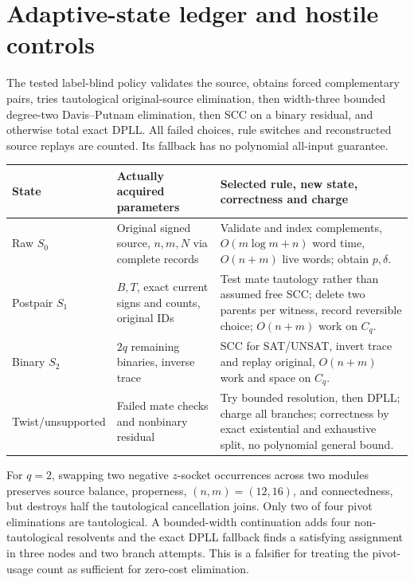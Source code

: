 \documentclass[11pt]{article}
\begin{document}
\section{Adaptive-state ledger and hostile controls}
The tested label-blind policy validates the source, obtains forced complementary pairs, tries tautological original-source elimination, then width-three bounded degree-two Davis--Putnam elimination, then SCC on a binary residual, and otherwise total exact DPLL. All failed choices, rule switches and reconstructed source replays are counted. Its fallback has no polynomial all-input guarantee.
\begin{center}\small
\begin{tabular}{p{.17\linewidth}p{.31\linewidth}p{.4\linewidth}}\toprule
State & Actually acquired parameters & Selected rule, new state, correctness and charge\\\midrule
Raw $S_0$ & Original signed source, $n,m,N$ via complete records & Validate and index complements, $O(m\log m+n)$ word time, $O(n+m)$ live words; obtain $p,\delta$.\\
Postpair $S_1$ & $B,T$, exact current signs and counts, original IDs & Test mate tautology rather than assumed free SCC; delete two parents per witness, record reversible choice; $O(n+m)$ work on $C_q$.\\
Binary $S_2$ & $2q$ remaining binaries, inverse trace & SCC for SAT/UNSAT, invert trace and replay original, $O(n+m)$ work and space on $C_q$.\\
Twist/unsupported & Failed mate checks and nonbinary residual & Try bounded resolution, then DPLL; charge all branches; correctness by exact existential and exhaustive split, no polynomial general bound.\\\bottomrule
\end{tabular}
\end{center}
For $q=2$, swapping two negative $z$-socket occurrences across two modules preserves source balance, properness, $(n,m)=(12,16)$, and connectedness, but destroys half the tautological cancellation joins. Only two of four pivot eliminations are tautological. A bounded-width continuation adds four non-tautological resolvents and the exact DPLL fallback finds a satisfying assignment in three nodes and two branch attempts. This is a falsifier for treating the pivot-usage count as sufficient for zero-cost elimination.
\end{document}
